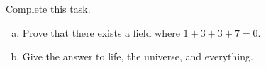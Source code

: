 \documentclass[english]{examreport}
\begin{document}
  \begin{examreport}
    \begin{task}[title = Optional title, points = 42]
      Complete this task.
      \begin{enumerate}[(a)]
        \item Prove that there exists a field where \(1 + 3 + 3 + 7 = 0\).
        \item Give the answer to life, the universe, and everything.
      \end{enumerate}
    \end{task}
  \end{examreport}
\end{document}
